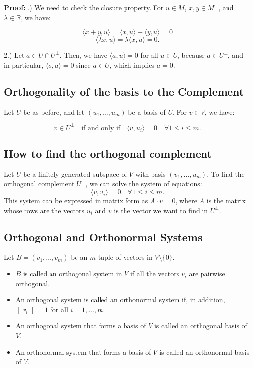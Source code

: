 \textbf{Proof:}
.) We need to check the closure property. For \( u \in M \), \( x, y \in M^\perp \), and \( \lambda \in \mathbb{R} \), we have:

\[
\langle x + y, u \rangle = \langle x, u \rangle + \langle y, u \rangle = 0
\]
\[
\langle \lambda x, u \rangle = \lambda \langle x, u \rangle = 0.
\]

2.) Let \( a \in U \cap U^\perp \). Then, we have \( \langle a, u \rangle = 0 \) for all \( u \in U \), because \( a \in U^\perp \), and in particular, \( \langle a, a \rangle = 0 \) since \( a \in U \), which implies \( a = 0 \).

\subsection{Orthogonality of the basis to the Complement}

Let \( U \) be as before, and let \( (u_1, \ldots, u_m) \) be a basis of \( U \). For \( v \in V \), we have:

\[
v \in U^\perp \quad \text{if and only if} \quad \langle v, u_i \rangle = 0 \quad \forall 1 \leq i \leq m.
\]

\subsection{How to find the orthogonal complement}
Let \( U \) be a finitely generated subspace of \( V \) with basis \( (u_1, \ldots, u_m) \). To find the orthogonal complement \( U^\perp \), we can solve the system of equations:
\[
\langle v, u_i \rangle = 0 \quad \forall 1 \leq i \leq m.
\]
This system can be expressed in matrix form as \( A \cdot v = 0 \), where \( A \) is the matrix whose rows are the vectors \( u_i \) and \( v \) is the vector we want to find in \( U^\perp \).

\subsection{Orthogonal and Orthonormal Systems}
Let \( B = (v_1, \ldots, v_m) \) be an \( m \)-tuple of vectors in \( V \setminus \{0\} \).
\begin{itemize}[label=\(-\)]
    \item \( B \) is called an orthogonal system in \( V \) if all the vectors \( v_i \) are pairwise orthogonal.
    \item An orthogonal system is called an orthonormal system if, in addition, \( \|v_i\| = 1 \) for all \( i = 1, \ldots, m \).
    \item An orthogonal system that forms a basis of \( V \) is called an orthogonal basis of \( V \).
    \item An orthonormal system that forms a basis of \( V \) is called an orthonormal basis of \( V \).
\end{itemize}


